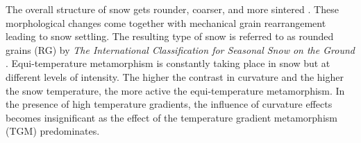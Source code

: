 \documentclass[draft,ms]{agujournal2019}
\begin{document}
The overall structure of snow gets rounder, coarser, and more sintered \cite{colbeck_thermodynamics_1980}. These morphological changes come together with mechanical grain rearrangement leading to snow settling. The resulting type of snow is referred to as rounded grains (RG) by \textit{The International Classification for Seasonal Snow on the Ground} \cite{fierz2009international}. Equi-temperature metamorphism is constantly taking place in snow but at different levels of intensity. The higher the contrast in curvature and the higher the snow temperature, the more active the equi-temperature metamorphism. In the presence of high temperature gradients, the influence of curvature effects becomes insignificant as the effect of the temperature gradient metamorphism (TGM) predominates.\\
\end{document}
